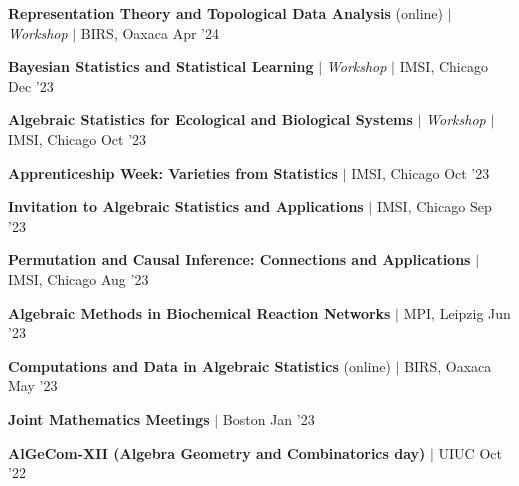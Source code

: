 \resumeProjectHeading
{\color{grey}\textbf{Representation Theory and Topological Data Analysis} (online) $|$ \textit{Workshop} $|$ BIRS, Oaxaca}
{Apr '24}
{}
\vspace{\mygap}

\resumeProjectHeading
{\textbf{Bayesian Statistics and Statistical Learning} $|$ \textit{Workshop} $|$ IMSI, Chicago}
{Dec '23}
{}
\vspace{\mygap}

\resumeProjectHeading
{\textbf{Algebraic Statistics for Ecological and Biological Systems} $|$ \textit{Workshop}  $|$ IMSI, Chicago}
{Oct '23}
{}
\vspace{\mygap}

\resumeProjectHeading
{\textbf{Apprenticeship Week: Varieties from Statistics} $|$ IMSI, Chicago}
{{Oct '23}}
{}
\vspace{\mygap}

\resumeProjectHeading
{\textbf{Invitation to Algebraic Statistics and Applications}   $|$ IMSI, Chicago}
{{Sep '23}}
{}
\vspace{\mygap}

\resumeProjectHeading
{\textbf{Permutation and Causal Inference: Connections and Applications} $|$ IMSI, Chicago}
{{Aug '23}}
{}
\vspace{\mygap}

\resumeProjectHeading
{\textbf{Algebraic Methods in Biochemical Reaction Networks}  $|$ MPI, Leipzig}
{{Jun '23}}
{}
\vspace{\mygap}

\resumeProjectHeading
{\textbf{Computations and Data in Algebraic Statistics} (online) $|$ BIRS, Oaxaca}
{May '23}
{}
\vspace{\mygap}

\resumeProjectHeading
{\textbf{Joint Mathematics Meetings}   $|$ Boston }
{Jan '23}
{}
\vspace{\mygap}

\resumeProjectHeading
{\textbf{AlGeCom-XII (Algebra Geometry and Combinatorics day)}  $|$ UIUC}
{Oct '22}
{}



